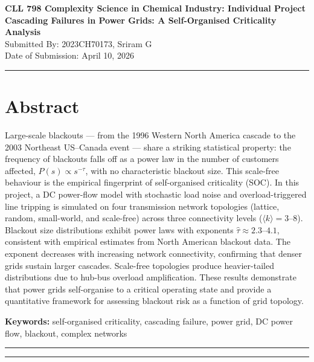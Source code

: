 \documentclass[12pt,a4paper]{article}
\begin{document}
\begin{center}
    {\LARGE \textbf{CLL 798 Complexity Science in Chemical Industry: Individual Project}}\\[1em]
    {\large \textbf{Cascading Failures in Power Grids: A Self-Organised Criticality Analysis}}\\[0.8em]
    {\large Submitted By: 2023CH70173, Sriram G}\\[0.5em]
    {\large Date of Submission: April 10, 2026}
\end{center}

\vspace{1em}
\hrule
\vspace{1.5em}

\section*{Abstract}

Large-scale blackouts — from the 1996 Western North America cascade to the
2003 Northeast US--Canada event — share a striking statistical property:
the frequency of blackouts falls off as a power law in the number of
customers affected, $P(s) \propto s^{-\tau}$, with no characteristic
blackout size. This scale-free behaviour is the empirical fingerprint of
self-organised criticality (SOC). In this project, a DC power-flow model
with stochastic load noise and overload-triggered line tripping is simulated
on four transmission network topologies (lattice, random, small-world, and
scale-free) across three connectivity levels ($\langle k \rangle = 3$--$8$).
Blackout size distributions exhibit power laws with exponents
$\hat{\tau} \approx 2.3$--$4.1$, consistent with empirical estimates from
North American blackout data. The exponent decreases with increasing network
connectivity, confirming that denser grids sustain larger cascades. Scale-free
topologies produce heavier-tailed distributions due to hub-bus overload
amplification. These results demonstrate that power grids self-organise to a
critical operating state and provide a quantitative framework for assessing
blackout risk as a function of grid topology.

\textbf{Keywords:} self-organised criticality, cascading failure, power grid,
DC power flow, blackout, complex networks

\vspace{1.5em}
\hrule
\tableofcontents
\vspace{1.5em}
\hrule
\vspace{1em}
\end{document}
